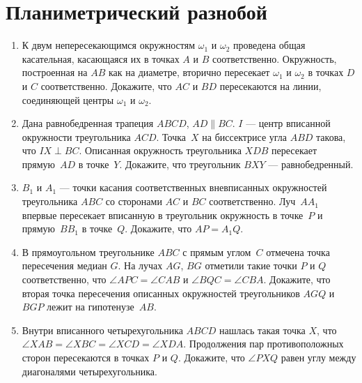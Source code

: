 
\section*{Планиметрический разнобой}


\begin{enumerate}

\item
К двум непересекающимся окружностям $\omega_1$ и $\omega_2$ проведена общая
касательная, касающаяся их в точках $A$ и $B$ соответственно.
Окружность, построенная на $AB$ как на диаметре, вторично пересекает
$\omega_1$ и $\omega_2$ в точках $D$ и $C$ соответственно.
Докажите, что $AC$ и $BD$ пересекаются на линии, соединяющей центры
$\omega_1$ и $\omega_2$.

\item
Дана равнобедренная трапеция $ABCD$, $AD \parallel BC$.
$I$ --- центр вписанной окружности треугольника $ACD$.
Точка~$X$ на биссектрисе угла $ABD$ такова, что $IX \perp BC$.
Описанная окружность треугольника $XDB$ пересекает прямую~$AD$ в точке~$Y$.
Докажите, что треугольник $BXY$ --- равнобедренный.

\item
$B_1$ и $A_1$ --- точки касания соответственных вневписанных окружностей
треугольника $ABC$ со сторонами $AC$ и $BC$ соответственно.
Луч~$A A_1$ впервые пересекает вписанную в треугольник окружность в точке~$P$
и прямую~$B B_1$ в точке~$Q$.
Докажите, что $AP = A_1 Q$.

\item
В прямоугольном треугольнике $ABC$ с прямым углом~$C$ отмечена точка
пересечения медиан $G$.
На лучах $AG$, $BG$ отметили такие точки $P$ и $Q$ соответственно, что
$\angle APC = \angle CAB$ и $\angle BQC = \angle CBA$.
Докажите, что вторая точка пересечения описанных окружностей треугольников
$AGQ$ и $BGP$ лежит на гипотенузе~$AB$.

\item
Внутри вписанного четырехугольника $ABCD$ нашлась такая точка $X$, что
$\angle XAB = \angle XBC = \angle XCD = \angle XDA$.
Продолжения пар противоположных сторон пересекаются в точках $P$ и $Q$.
Докажите, что $\angle PXQ$ равен углу между диагоналями четырехугольника.


\end{enumerate}
